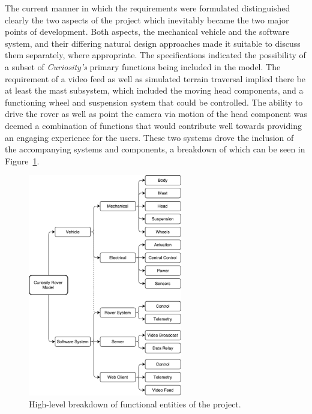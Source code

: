     The current manner in which the requirements were formulated distinguished clearly the two aspects of the project which inevitably became the two major points of development. Both aspects, the mechanical vehicle and the software system, and their differing natural design approaches made it suitable to discuss them separately, where appropriate. The specifications indicated the possibility of a subset of \textit{Curiosity's} primary functions being included in the model. The requirement of a video feed as well as simulated terrain traversal implied there be at least the mast subsystem, which included the moving head components, and a functioning wheel and suspension system that could be controlled. The ability to drive the rover as well as point the camera via motion of the head component was deemed a combination of functions that would contribute well towards providing an engaging experience for the users. These two systems drove the inclusion of the accompanying systems and components, a breakdown of which can be seen in Figure~\ref{fig:specs-functionalBreakdown}.
    
    \begin{figure}[h]
      \centering
      \includegraphics[width=0.6\textwidth]{figures/specs-functionalBreakdown}
      \caption[High-level breakdown of functional entities of the project.]{High-level breakdown of functional entities of the project.}
      \label{fig:specs-functionalBreakdown}
    \end{figure}
        
